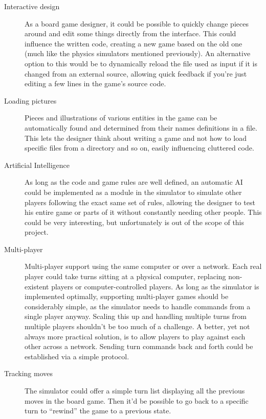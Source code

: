 \begin{description}
  \item[Interactive design] As a board game designer, it could be possible to
    quickly change pieces around and edit some things directly from the
    interface. This could influence the written code, creating a new game based
    on the old one (much like the physics simulators mentioned previously).
    An alternative option to this would be to dynamically reload the file used
    as input if it is changed from an external source, allowing quick feedback
    if you're just editing a few lines in the game's source code.

  \item[Loading pictures] Pieces and illustrations of various entities in the
    game can be automatically found and determined from their names definitions
    in a \productname{} file. This lets the designer think about writing a game
    and not how to load specific files from a directory and so on, easily
    influencing cluttered code.

  \item[Artificial Intelligence] As long as the code and game rules are well
    defined, an automatic AI could be implemented as a module in the simulator
    to simulate other players following the exact same set of rules, allowing
    the designer to test his entire game or parts of it without constantly
    needing other people. This could be very interesting, but unfortunately is
    out of the scope of this project.

  \item[Multi-player] Multi-player support using the same computer or over a
    network. Each real player could take turns sitting at a physical computer,
    replacing non-existent players or computer-controlled players. As long as
    the simulator is implemented optimally, supporting multi-player games should
    be considerably simple, as the simulator needs to handle commands from a
    single player anyway. Scaling this up and handling multiple turns from
    multiple players shouldn't be too much of a challenge. A better, yet not
    always more practical solution, is to allow players to play against each
    other across a network. Sending turn commands back and forth could be
    established via a simple protocol.

  \item[Tracking moves] The simulator could offer a simple turn list displaying
    all the previous moves in the board game. Then it'd be possible to go back
    to a specific turn to ``rewind'' the game to a previous state.
\end{description}

